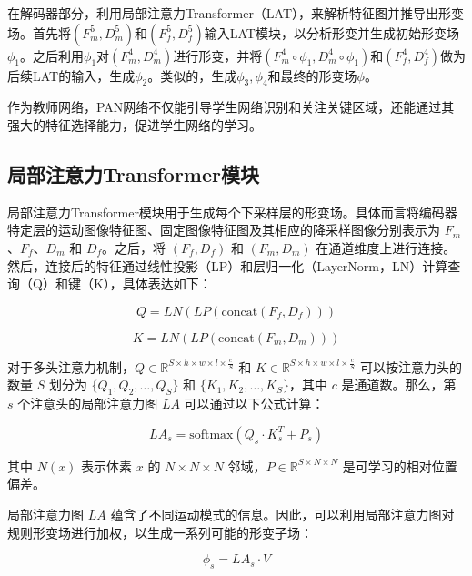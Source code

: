 在解码器部分，利用局部注意力Transformer（LAT），来解析特征图并推导出形变场。首先将$(F_m^5,D_m^5)$和$(F_f^5,D_f^5)$输入LAT模块，以分析形变并生成初始形变场$\phi_1$。之后利用$\phi_1$对$(F_m^4,D_m^4)$进行形变，并将$(F_m^4\circ \phi_1,D_m^4\circ\phi_1 )$和$(F_f^4,D_f^4)$做为后续LAT的输入，生成$\phi_2$。类似的，生成$\phi_3,\phi_4$和最终的形变场$\phi$。

作为教师网络，PAN网络不仅能引导学生网络识别和关注关键区域，还能通过其强大的特征选择能力，促进学生网络的学习。

\subsection{局部注意力Transformer模块}

局部注意力Transformer模块用于生成每个下采样层的形变场。具体而言将编码器特定层的运动图像特征图、固定图像特征图及其相应的降采样图像分别表示为 \( F_m \)、\( F_f \)、\( D_m \) 和 \( D_f \)。之后，将 \( (F_f, D_f) \) 和 \( (F_m, D_m) \) 在通道维度上进行连接。然后，连接后的特征通过线性投影（LP）和层归一化（LayerNorm，LN）计算查询（Q）和键（K），具体表达如下：

\begin{equation}
    Q = LN(LP(\text{concat}(F_f, D_f)))
\end{equation}

\begin{equation}
    K = LN(LP(\text{concat}(F_m, D_m)))
\end{equation}

对于多头注意力机制，\( Q \in \mathbb{R}^{S \times h \times w \times l \times \frac{c}{S}} \) 和 \( K \in \mathbb{R}^{S \times h \times w \times l \times \frac{c}{S}} \) 可以按注意力头的数量 \( S \) 划分为 \( \{ Q_1, Q_2, \ldots, Q_S \} \) 和 \( \{ K_1, K_2, \ldots, K_S \} \)，其中 \( c \) 是通道数。那么，第 \( s \) 个注意头的局部注意力图 \( LA \) 可以通过以下公式计算：

\begin{equation}
    LA_s = \text{softmax}\left(Q_s \cdot K_s^T + P_s\right)
\end{equation}

其中 \( N(x) \) 表示体素 \( x \) 的 \( N \times N \times N \) 邻域，\( P \in \mathbb{R}^{S \times N \times N} \) 是可学习的相对位置偏差。

局部注意力图 \( LA \) 蕴含了不同运动模式的信息。因此，可以利用局部注意力图对规则形变场进行加权，以生成一系列可能的形变子场：

\begin{equation}
    \phi_s = LA_s \cdot V
\end{equation}

